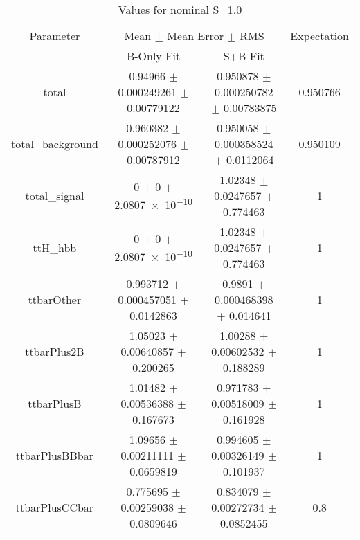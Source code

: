 \begin{table}
\centering
\caption{Values for nominal S=1.0}
\begin{tabular}{cccc}
\toprule
Parameter & \multicolumn{2}{c}{Mean $\pm$ Mean Error $\pm$ RMS} & Expectation\\
 & B-Only Fit & S+B Fit & \\
\midrule
total & \num{0.94966} $\pm$ \num{0.000249261} $\pm$ \num{0.00779122} & \num{0.950878} $\pm$ \num{0.000250782} $\pm$ \num{0.00783875} & \num{0.950766}\\
total\_background & \num{0.960382} $\pm$ \num{0.000252076} $\pm$ \num{0.00787912} & \num{0.950058} $\pm$ \num{0.000358524} $\pm$ \num{0.0112064} & \num{0.950109}\\
total\_signal & \num{0} $\pm$ \num{0} $\pm$ \num{2.0807e-10} & \num{1.02348} $\pm$ \num{0.0247657} $\pm$ \num{0.774463} & \num{1}\\
ttH\_hbb & \num{0} $\pm$ \num{0} $\pm$ \num{2.0807e-10} & \num{1.02348} $\pm$ \num{0.0247657} $\pm$ \num{0.774463} & \num{1}\\
ttbarOther & \num{0.993712} $\pm$ \num{0.000457051} $\pm$ \num{0.0142863} & \num{0.9891} $\pm$ \num{0.000468398} $\pm$ \num{0.014641} & \num{1}\\
ttbarPlus2B & \num{1.05023} $\pm$ \num{0.00640857} $\pm$ \num{0.200265} & \num{1.00288} $\pm$ \num{0.00602532} $\pm$ \num{0.188289} & \num{1}\\
ttbarPlusB & \num{1.01482} $\pm$ \num{0.00536388} $\pm$ \num{0.167673} & \num{0.971783} $\pm$ \num{0.00518009} $\pm$ \num{0.161928} & \num{1}\\
ttbarPlusBBbar & \num{1.09656} $\pm$ \num{0.00211111} $\pm$ \num{0.0659819} & \num{0.994605} $\pm$ \num{0.00326149} $\pm$ \num{0.101937} & \num{1}\\
ttbarPlusCCbar & \num{0.775695} $\pm$ \num{0.00259038} $\pm$ \num{0.0809646} & \num{0.834079} $\pm$ \num{0.00272734} $\pm$ \num{0.0852455} & \num{0.8}\\
\bottomrule
\end{tabular}
\end{table}